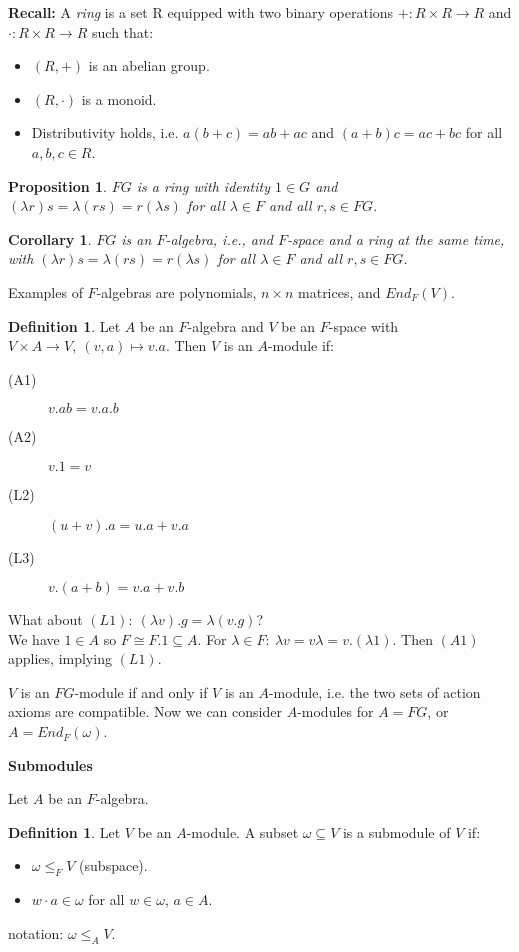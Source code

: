 \documentclass[12pt]{amsart}
\newtheorem{proposition}[theorem]{Proposition}
\newtheorem{corollary}[theorem]{Corollary}
\theoremstyle{definition}
\newtheorem{definition}[theorem]{Definition}
\begin{document}
\textbf{Recall:} A \emph{ring} is a set R equipped with two binary operations $+:R\times R\rightarrow R$ and $\cdot:R\times R\rightarrow R$ such that:
\begin{itemize}
\item $(R, +)$ is an abelian group.
\item $(R, \cdot)$ is a monoid.
\item Distributivity holds, i.e. $a(b+c)=ab+ac$ and $(a+b)c=ac+bc$ for all $a, b, c\in R$.
\end{itemize}

\begin{proposition}
$FG$ is a ring with identity $1\in G$ and $(\lambda r)s=\lambda(rs)=r(\lambda s)$ for all $\lambda\in F$ and all $r, s\in FG$.
\end{proposition}

\begin{corollary}
$FG$ is an $F$-algebra, i.e., and $F$-space and a ring at the same time, with $(\lambda r)s=\lambda(rs)=r(\lambda s)$ for all $\lambda\in F$ and all $r, s\in FG$.
\end{corollary}

Examples of $F$-algebras are polynomials, $n\times n$ matrices, and $End_F(V)$.

\begin{definition}
Let $A$ be an $F$-algebra and $V$ be an $F$-space with $V\times A\rightarrow V,\ (v,a)\mapsto v.a$.  Then $V$ is an $A$-module if:
\begin{description}
\item[(A1)] $v.ab=v.a.b$
\item[(A2)] $v.1=v$
\item[(L2)] $(u+v).a=u.a+v.a$
\item[(L3)] $v.(a+b)=v.a+v.b$
\end{description}
\end{definition}

What about $(L1):\ (\lambda v).g=\lambda(v.g)$?\\
We have $1\in A$ so $F\cong F.1\subseteq A$.  For $\lambda\in F:\ \lambda v=v\lambda=v.(\lambda 1)$.  Then $(A1)$ applies, implying $(L1)$.

$V$ is an $FG$-module if and only if $V$ is an $A$-module, i.e. the two sets of action axioms are compatible. Now we can consider $A$-modules for $A = FG$, or $A = End_{F} (\omega)$.

\begin{center}
\textbf{Submodules}
\end{center}
Let $A$ be an $F$-algebra.
\begin{definition}
Let $V$ be an $A$-module. A subset $\omega \subseteq V$ is a submodule of $V$ if:
\begin{itemize}
\item $\omega \leq_{F} V$ (subspace).
\item $w \cdot a \in \omega$ for all $w \in \omega$, $a \in A$.
\end{itemize}
notation: $\omega \leq_{A} V$.
\end{definition}
\end{document}

